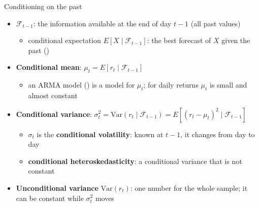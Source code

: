 \begin{frame}{Conditioning on the past}
\itemsize{\small}
\begin{itemize}
    \item $\mathcal{F}_{t-1}$: the information available at the end of day $t-1$ (all past values)
    \begin{itemize}
        \item conditional expectation $E[X \mid \mathcal{F}_{t-1}]$: the best forecast of $X$ given the past ()
    \end{itemize}
    \item \textbf{Conditional mean}: $\mu_t = E[r_t \mid \mathcal{F}_{t-1}]$
    \begin{itemize}
        \item an ARMA model () is a model for $\mu_t$; for daily returns $\mu_t$ is small and almost constant
    \end{itemize}
    \item \textbf{Conditional variance}: $\sigma_t^2 = \mathrm{Var}(r_t \mid \mathcal{F}_{t-1}) = E[(r_t - \mu_t)^2 \mid \mathcal{F}_{t-1}]$
    \begin{itemize}
        \item $\sigma_t$ is the \textbf{conditional volatility}: known at $t-1$, it changes from day to day
        \item \textbf{conditional heteroskedasticity}: a conditional variance that is not constant
    \end{itemize}
    \item \textbf{Unconditional variance} $\mathrm{Var}(r_t)$: one number for the whole sample; it can be constant while $\sigma_t^2$ moves
\end{itemize}
\end{frame}

